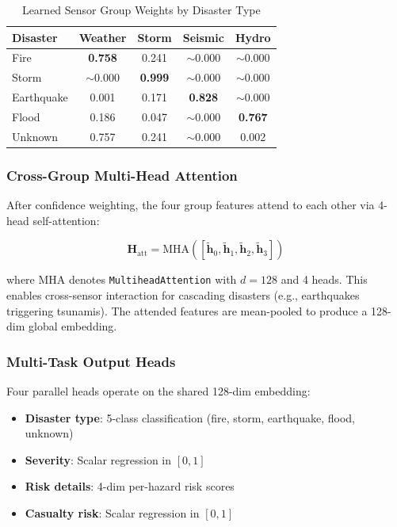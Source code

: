 \documentclass[journal]{IEEEtran}
\begin{document}
\begin{table}[!t]
\centering
\caption{Learned Sensor Group Weights by Disaster Type}
\label{tab:sensor_weights}
\begin{tabular}{lcccc}
\toprule
\textbf{Disaster} & \textbf{Weather} & \textbf{Storm} & \textbf{Seismic} & \textbf{Hydro} \\
\midrule
Fire       & \textbf{0.758} & 0.241 & $\sim$0.000 & $\sim$0.000 \\
Storm      & $\sim$0.000 & \textbf{0.999} & $\sim$0.000 & $\sim$0.000 \\
Earthquake & 0.001 & 0.171 & \textbf{0.828} & $\sim$0.000 \\
Flood      & 0.186 & 0.047 & $\sim$0.000 & \textbf{0.767} \\
Unknown    & 0.757 & 0.241 & $\sim$0.000 & 0.002 \\
\bottomrule
\end{tabular}
\end{table}

\subsubsection{Cross-Group Multi-Head Attention}

After confidence weighting, the four group features attend to each other via 4-head self-attention:

\begin{equation}
\mathbf{H}_\text{att} = \text{MHA}([\tilde{\mathbf{h}}_0, \tilde{\mathbf{h}}_1, \tilde{\mathbf{h}}_2, \tilde{\mathbf{h}}_3])
\end{equation}

where $\text{MHA}$ denotes \texttt{MultiheadAttention} with $d=128$ and 4 heads. This enables cross-sensor interaction for cascading disasters (e.g., earthquakes triggering tsunamis). The attended features are mean-pooled to produce a 128-dim global embedding.

\subsubsection{Multi-Task Output Heads}

Four parallel heads operate on the shared 128-dim embedding:

\begin{itemize}
    \item \textbf{Disaster type}: 5-class classification (fire, storm, earthquake, flood, unknown)
    \item \textbf{Severity}: Scalar regression in $[0, 1]$
    \item \textbf{Risk details}: 4-dim per-hazard risk scores
    \item \textbf{Casualty risk}: Scalar regression in $[0, 1]$
\end{itemize}
\end{document}
